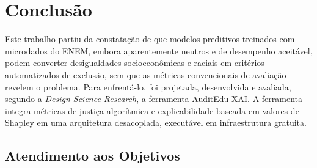 \chapter{Conclusão}
\label{cap:conclusao}

Este trabalho partiu da constatação de que modelos preditivos treinados com microdados do ENEM, embora aparentemente neutros e de desempenho aceitável, podem converter desigualdades socioeconômicas e raciais em critérios automatizados de exclusão, sem que as métricas convencionais de avaliação revelem o problema. Para enfrentá-lo, foi projetada, desenvolvida e avaliada, segundo a \textit{Design Science Research}, a ferramenta AuditEdu-XAI. A ferramenta integra métricas de justiça algorítmica e explicabilidade baseada em valores de Shapley em uma arquitetura desacoplada, executável em infraestrutura gratuita.

\section{Atendimento aos Objetivos}


